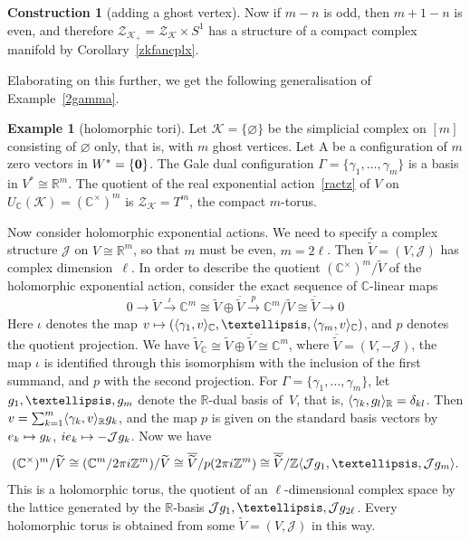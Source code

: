 \documentclass[a4paper]{amsart}
\theoremstyle{definition}
\newtheorem{example}[theorem]{Example}
\newtheorem{construction}[theorem]{Construction}
\theoremstyle{remark}
\numberwithin{equation}{section}
\def\R{\mathbb R}
\def\C{\mathbb C}
\def\R{\mathbb R}
\def\Z{\mathbb Z}
\def\sK{\mathcal K}
\newcommand{\mb}[1]{{\textbf {\textit#1}}}
\newcommand{\zk}{\mathcal Z_{\mathcal K}}
\newcommand{\<}{\langle}
\renewcommand{\>}{\rangle}
\begin{document}
\begin{construction}[adding a ghost vertex]
Now if $m-n$ is odd, then $m+1-n$ is even, and therefore $\mathcal Z_{\sK_+}=\zk\times S^1$ has a structure of a compact complex manifold by Corollary~\ref{zkfancplx}.
\end{construction}

Elaborating on this further, we get the following generalisation of Example~\ref{2gamma}.

\begin{example}[holomorphic tori]\label{exhtorus}
Let $\sK=\{\varnothing\}$ be the simplicial complex  on $[m]$ consisting of 
$\varnothing$ only, that is, with $m$ ghost vertices.  Let $\mathrm A$ be a configuration of $m$ zero vectors in $W^*=\{\bf 0\}$. The Gale dual configuration 
$\Gamma=\{\gamma_1,\ldots,\gamma_m\}$ is a basis in $V^*\cong\R^m$. The quotient of the real exponential action~\eqref{ractz} of $V$ on $U_\C(\sK)=(\C^\times)^m$ is $\zk=T^m$, the compact $m$-torus. 

Now consider holomorphic exponential actions. We need to specify a complex structure $\mathcal J$ on $V\cong\R^m$, so that $m$ must be even, $m=2\ell$. Then $\widetilde V=(V,\mathcal J)$ has complex dimension~$\ell$. In order to describe the quotient $(\C^\times)^m/\widetilde V$ of the holomorphic exponential action, consider the exact sequence of $\C$-linear maps
\[
  0\longrightarrow\widetilde V\stackrel\iota\longrightarrow
  \C^m\cong\widetilde V\oplus\overline{\widetilde V}
  \stackrel p\longrightarrow \C^m/\widetilde V\cong  \overline{\widetilde V}
  \longrightarrow 0
\]
Here $\iota$ denotes the map $\mb v\mapsto(\langle\gamma_1,\mb v\rangle_\C,\ldots,\langle\gamma_m,\mb v\rangle_\C)$, and $p$ denotes the quotient projection. We have $\widetilde V_\C\cong\widetilde V\oplus\overline{\widetilde V}\cong\C^m$, where 
$\overline{\widetilde V}=(V,-\mathcal J)$, the map 
$\iota$ is identified through this isomorphism with the inclusion of the first summand, and $p$ with the second projection. For 
$\Gamma=\{\gamma_1,\ldots,\gamma_m\}$,  let $\mb g_1,\ldots,\mb g_m$ denote the $\R$-dual basis of~$V$, that is, 
$\langle\gamma_k,\mb g_l\rangle_\R=\delta_{kl}$. Then $\mb v=
\sum_{k=1}^m\langle\gamma_k,\mb v\rangle_\R\mb g_k$, and the map $p$ is given on the standard basis vectors by $\mb e_k\mapsto\mb g_k$, $i\mb e_k\mapsto-\mathcal J\mb g_k$. Now we have
\[
  (\C^\times)^m/\widetilde V%
  \cong(\C^m/2\pi i\Z^m)/\widetilde V\cong \overline{\widetilde V}/p(2\pi i\Z^m)
  \cong\overline{\widetilde V}/\Z\langle\mathcal J\mb g_1,\ldots,
  \mathcal J\mb g_m\rangle.
\]
This is a holomorphic torus, the quotient of an $\ell$-dimensional complex space by the lattice generated by the $\R$-basis $\mathcal J\mb g_1,\ldots,\mathcal J
\mb g_{2\ell}$. Every holomorphic torus is obtained from some $\widetilde V=(V,\mathcal J)$ in this way.
\end{example}
\end{document}
